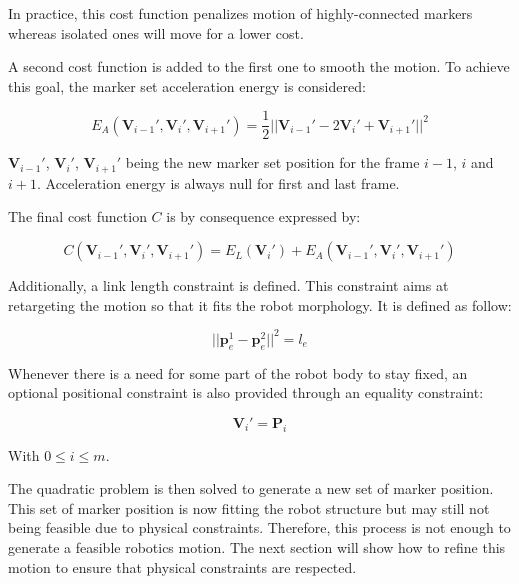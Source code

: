 \documentclass[letterpaper, 10 pt, conference]{ieeeconf}  %
\begin{document}
In practice, this cost function penalizes motion of highly-connected
markers whereas isolated ones will move for a lower cost.


A second cost function is added to the first one to smooth the
motion. To achieve this goal, the marker set acceleration energy is
considered:

\begin{equation}
  E_A(\mathbf{V}_{i-1}', \mathbf{V}_{i}', \mathbf{V}_{i+1}') =
  \frac{1}{2} || \mathbf{V}_{i-1}' - 2 \mathbf{V}_{i}' + \mathbf{V}_{i+1}' ||^2
\end{equation}

$\mathbf{V}_{i-1}'$, $\mathbf{V}_{i}'$, $\mathbf{V}_{i+1}'$ being the
new marker set position for the frame $i - 1$, $i$ and $i +
1$. Acceleration energy is always null for first and last frame.

The final cost function $C$ is by consequence expressed by:

\begin{equation}
    C(\mathbf{V}_{i-1}', \mathbf{V}_{i}', \mathbf{V}_{i+1}') =
    E_L(\mathbf{V}_{i}') + E_A(\mathbf{V}_{i-1}', \mathbf{V}_{i}', \mathbf{V}_{i+1}')
\end{equation}


Additionally, a link length constraint is defined. This constraint
aims at retargeting the motion so that it fits the robot
morphology. It is defined as follow:

\begin{equation}
|| \mathbf{p}^1_e - \mathbf{p}^2_e ||^2 = l_e
\end{equation}


Whenever there is a need for some part of the robot body to stay
fixed, an optional positional constraint is also provided through an
equality constraint:

\begin{equation}
  \mathbf{V}_i' = \mathbf{P}_i
\end{equation}

With $0 \leq i \leq m$.



The quadratic problem is then solved to generate a new set of marker
position. This set of marker position is now fitting the robot
structure but may still not being feasible due to physical
constraints. Therefore, this process is not enough to generate a
feasible robotics motion. The next section will show how to refine
this motion to ensure that physical constraints are respected.
\end{document}
